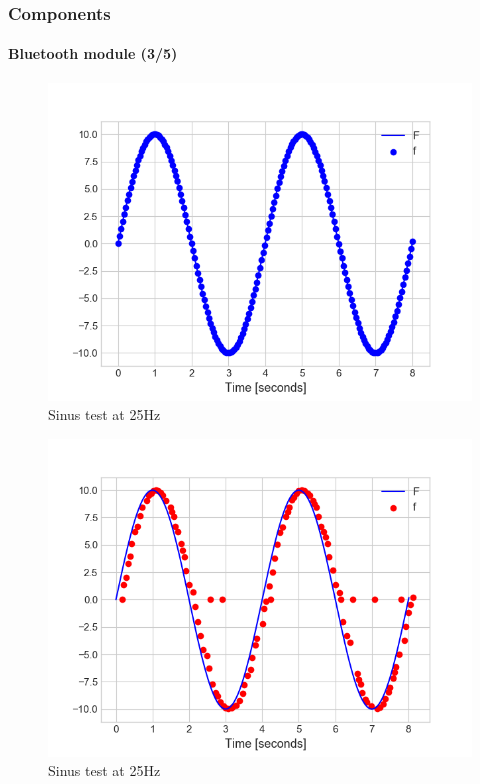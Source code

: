 \documentclass[10pt]{beamer}
\begin{document}

\begin{frame}
\frametitle{Components}
\framesubtitle{Bluetooth module (3/5)}
\begin{multicols}{2}
\begin{figure}
\centering
\includegraphics[scale=0.4]{figures/sending-25hz.png}
\caption{Sinus test at 25Hz}
\end{figure}
\columnbreak
\begin{figure}
\centering
\includegraphics[scale=0.4]{figures/reception-25hz.png}
\caption{Sinus test at 25Hz}
\end{figure}
\end{multicols}
\end{frame}
\end{document}
